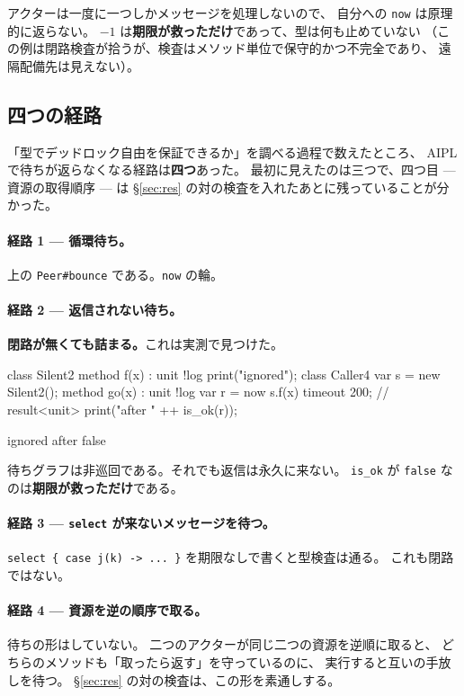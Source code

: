 \documentclass[11pt,a4paper]{ltjsarticle}
\theoremstyle{definition}
\theoremstyle{remark}
\begin{document}
アクターは一度に一つしかメッセージを処理しないので、
自分への \texttt{now} は原理的に返らない。
$-1$ は\textbf{期限が救っただけ}であって、型は何も止めていない
（この例は閉路検査が拾うが、検査はメソッド単位で保守的かつ不完全であり、
遠隔配備先は見えない）。

\subsection{四つの経路}
\label{sec:dl3}

「型でデッドロック自由を保証できるか」を調べる過程で数えたところ、
AIPL で待ちが返らなくなる経路は\textbf{四つ}あった。
最初に見えたのは三つで、四つ目 --- 資源の取得順序 --- は
\S\ref{sec:res} の対の検査を入れたあとに残っていることが分かった。

\paragraph{経路 1 --- 循環待ち。}
上の \texttt{Peer\#bounce} である。\texttt{now} の輪。

\paragraph{経路 2 --- 返信されない待ち。}
\textbf{閉路が無くても詰まる。}これは実測で見つけた。

\begin{aipl}
class Silent2 { method f(x) : unit !{log} { print("ignored"); } }
class Caller4 {
  var s = new Silent2();
  method go(x) : unit !{log} {
    var r = now s.f(x) timeout 200;      // result<unit>
    print("after " ++ is_ok(r));
  }
}
\end{aipl}
\begin{term}
ignored
after false
\end{term}

待ちグラフは非巡回である。それでも返信は永久に来ない。
\texttt{is\_ok} が \texttt{false} なのは\textbf{期限が救っただけ}である。

\paragraph{経路 3 --- \texttt{select} が来ないメッセージを待つ。}
\texttt{select \{ case j(k) -> ... \}} を期限なしで書くと型検査は通る。
これも閉路ではない。

\paragraph{経路 4 --- 資源を逆の順序で取る。}
待ちの形はしていない。
二つのアクターが同じ二つの資源を逆順に取ると、
どちらのメソッドも「取ったら返す」を守っているのに、
実行すると互いの手放しを待つ。
\S\ref{sec:res} の対の検査は、この形を素通しする。
\end{document}
